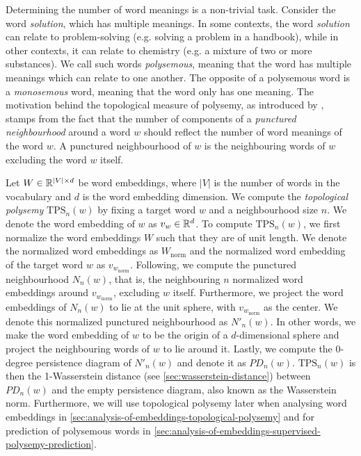 Determining the number of word meanings is a non-trivial task. Consider the word \textit{solution}, which has multiple meanings. In some contexts, the word \textit{solution} can relate to problem-solving (e.g. solving a problem in a handbook), while in other contexts, it can relate to chemistry (e.g. a mixture of two or more substances). We call such words \textit{polysemous}, meaning that the word has multiple meanings which can relate to one another. The opposite of a polysemous word is a \textit{monosemous} word, meaning that the word only has one meaning. The motivation behind the topological measure of polysemy, as introduced by \cite{jakubowski2020topology}, stamps from the fact that the number of components of a \textit{punctured neighbourhood} around a word $w$ should reflect the number of word meanings of the word $w$. A punctured neighbourhood of $w$ is the neighbouring words of $w$ excluding the word $w$ itself.

Let $W \in \mathbb{R}^{|V| \times d}$ be word embeddings, where $|V|$ is the number of words in the vocabulary and $d$ is the word embedding dimension. We compute the \textit{topological polysemy} $\text{TPS}_n(w)$ by fixing a target word $w$ and a neighbourhood size $n$. We denote the word embedding of $w$ as $v_w \in \mathbb{R}^{d}$. To compute $\text{TPS}_n(w)$, we first normalize the word embeddings $W$ such that they are of unit length. We denote the normalized word embeddings as $W_\text{norm}$ and the normalized word embedding of the target word $w$ as $v_{w_{\text{norm}}}$. Following, we compute the punctured neighbourhood $N_n(w)$, that is, the neighbouring $n$ normalized word embeddings around $v_{w_{\text{norm}}}$, excluding $w$ itself. Furthermore, we project the word embeddings of $N_n(w)$ to lie at the unit sphere, with $v_{w_{\text{norm}}}$ as the center. We denote this normalized punctured neighbourhood as $N'_n(w)$. In other words, we make the word embedding of $w$ to be the origin of a $d$-dimensional sphere and project the neighbouring words of $w$ to lie around it. Lastly, we compute the 0-degree persistence diagram of $N'_n(w)$ and denote it as $PD_n(w)$. $\text{TPS}_n(w)$ is then the 1-Wasserstein distance (see \cref{sec:wasserstein-distance}) between $PD_n(w)$ and the empty persistence diagram, also known as the Wasserstein norm. Furthermore, we will use topological polysemy later when analysing word embeddings in \cref{sec:analysis-of-embeddings-topological-polysemy} and for prediction of polysemous words in \cref{sec:analysis-of-embeddings-supervised-polysemy-prediction}.

